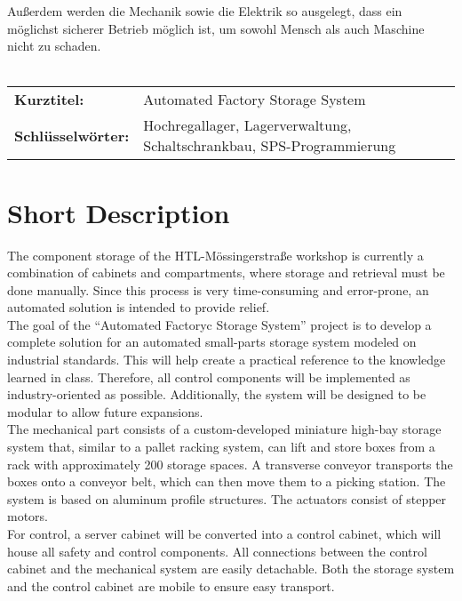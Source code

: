 \documentclass[12pt, twoside]{article}
\begin{document}
Außerdem werden die Mechanik sowie die Elektrik so ausgelegt, dass ein möglichst sicherer Betrieb möglich ist, um sowohl Mensch als auch Maschine nicht zu schaden.
\\\\
\bgroup
    \def\arraystretch{1.5}
    \begin{tabular}{p{48mm}p{113mm}}
        \textbf{Kurztitel:} & Automated Factory Storage System\\
        \textbf{Schlüsselwörter:} & Hochregallager, Lagerverwaltung, Schaltschrankbau, SPS-Programmierung
    \end{tabular}
\egroup

\newpage

\section*{Short Description}

The component storage of the HTL-Mössingerstraße workshop is currently a combination of cabinets and compartments, where storage and retrieval must be done manually. Since this process is very time-consuming and error-prone, an automated solution is intended to provide relief. \\

The goal of the \enquote{Automated Factoryc Storage System} project is to develop a complete solution for an automated small-parts storage system modeled on industrial standards. This will help create a practical reference to the knowledge learned in class. Therefore, all control components will be implemented as industry-oriented as possible. Additionally, the system will be designed to be modular to allow future expansions.\\

The mechanical part consists of a custom-developed miniature high-bay storage system that, similar to a pallet racking system, can lift and store boxes from a rack with approximately 200 storage spaces. A transverse conveyor transports the boxes onto a conveyor belt, which can then move them to a picking station. The system is based on aluminum profile structures. The actuators consist of stepper motors.\\

For control, a server cabinet will be converted into a control cabinet, which will house all safety and control components. All connections between the control cabinet and the mechanical system are easily detachable. Both the storage system and the control cabinet are mobile to ensure easy transport.\\
\end{document}
